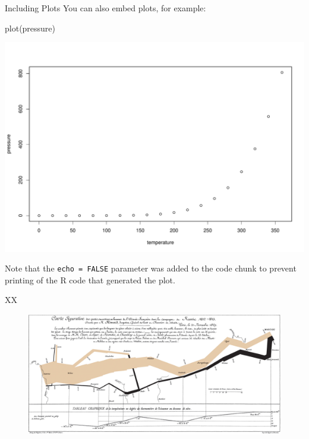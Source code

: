 \documentclass[
  8pt,
  ignorenonframetext,
  aspectratio=169]{beamer}
\newenvironment{Shaded}{}{}
\newcommand{\FunctionTok}[1]{\textcolor[rgb]{0.02,0.16,0.49}{#1}}
\newcommand{\NormalTok}[1]{#1}
\begin{document}
\begin{frame}[fragile]{Including Plots}
\protect\hypertarget{including-plots}{}
You can also embed plots, for example:

\begin{Shaded}
\begin{Highlighting}[]
\FunctionTok{plot}\NormalTok{(pressure)}
\end{Highlighting}
\end{Shaded}

\includegraphics{crashcourse_slides_files/figure-beamer/pressure-1.pdf}

Note that the \texttt{echo\ =\ FALSE} parameter was added to the code
chunk to prevent printing of the R code that generated the plot.
\end{frame}

\begin{frame}{XX}
\protect\hypertarget{xx-1}{}
\begin{figure}[H]
    \centering
    \includegraphics[width=.90\textwidth]{pictures/Minard.png}
\end{figure}
\end{frame}
\end{document}
